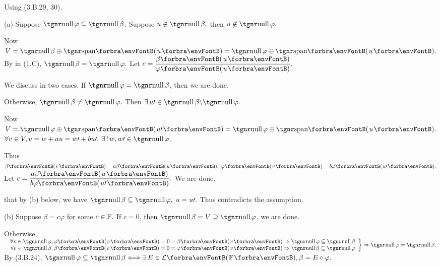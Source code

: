 \par\quad
Using (3.B.29, 30).\par\quad
(a) Suppose $\null \varphi \subseteq\null\beta$. Suppose $u\not\in\null\beta,$ then $u\not\in\null\varphi.$\vspace{-4pt}\par\quad\Ha
Now $V=\null\beta\oplus\Span{u}=\null\varphi\oplus\Span{u}.$ By \TIPS in (1.C), $\null\beta=\null\varphi.$ \;Let $c=\Frac{\beta\Par{u}}{\varphi\Par{u}}.$\vspace{2pt}\par\quad\Ha
\Or We discuss in two cases. If $\null\varphi=\null\beta$, then we are done.\par\quad\Ha
Otherwise, $\null\beta\neq\null\varphi.$ Then $\exists\,u\apostrophe\in\null\beta\backslash\null\varphi.$\par\quad\Ha
Now $V=\null\varphi\oplus\Span{u\apostrophe}=\null\varphi\oplus\Span{u}.$ $\forall v \in V, v=w+au=w\apostrophe+bu\apostrophe,\,\exists\,!\,w, w\apostrophe\in\null\varphi.$\vspace{5pt}\par\quad\Ha
Thus $\beta\Par{v}=a\beta\Par{u},\,\,\varphi\Par{v} = b\varphi\Par{u\apostrophe}.$ Let $c=\Frac{a\beta\Par{u}}{b\varphi\Par{u\apostrophe}}.$ We are done.\vspace{6pt}\par\quad\Ha
\NOTICE that by (b) below, we have $\null\beta\subseteq\null\varphi,\;u=u\apostrophe.$ Thus contradicts the assumption.\vspace{6pt}\par\quad
(b) Suppose $\beta=c\varphi$ for some $c\in{\mathbb{F}}.$ If $c=0$, then $\null \beta=V\supseteq\null\varphi$, we are done.\vspace{2pt}\par\quad\Hb
Otherwise,$\MathRightBrace{r}{$
	$\forall v\in\null\varphi,\varphi\Par{v}=0=\beta\Par{v} \Rightarrow\null\varphi\subseteq\null\beta\\
	\forall v \in\null\beta,\beta\Par{v}=0=\varphi\Par{v}\Rightarrow\null \beta\subseteq\null\varphi}\Rightarrow\null\varphi=\null\beta.$\PfEnd\vspace{10pt}\quad
\Or By (3.B.24), $\null\varphi\subseteq\null\beta\Longleftrightarrow\exists\,E\in\Lm{\Fbb},\beta=E\circ\varphi.$ \par\quad

